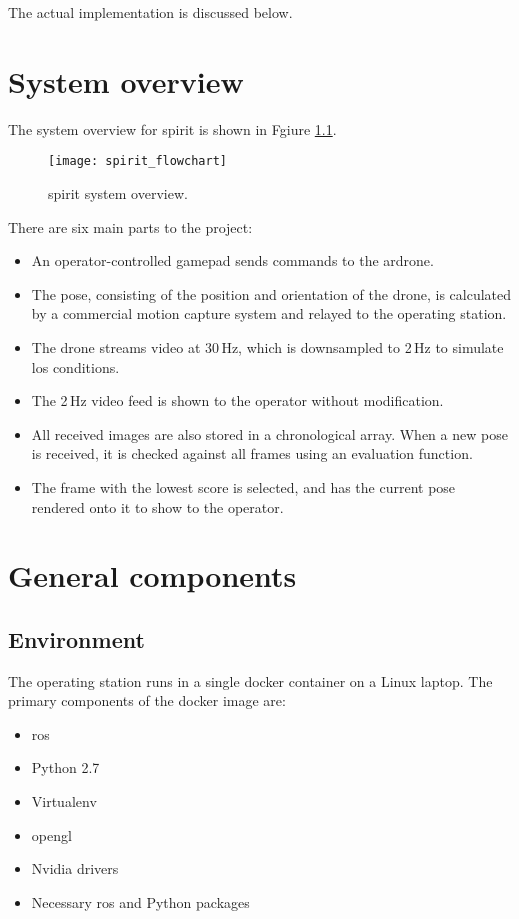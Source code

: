   The actual implementation is discussed below.

\chapter{System overview}
  The system overview for \gls{spirit} is shown in Fgiure \ref{fig:spirit_flowchart}.

  \begin{figure}[h]
    \centering
    \texttt{[image: spirit\_flowchart]}
    \caption[SPIRIT system overview]{\gls{spirit} system overview.}
    \label{fig:spirit_flowchart}
  \end{figure}

  There are six main parts to the project:

  \begin{itemize}
    \item An operator-controlled gamepad sends commands to the \gls{ardrone}.
    \item The pose, consisting of the position and orientation of the drone, is calculated by a commercial motion capture system and relayed to the operating station.
    \item The drone streams video at 30\,Hz, which is downsampled to 2\,Hz to simulate \gls{los} conditions.
    \item The 2\,Hz video feed is shown to the operator without modification.
    \item All received images are also stored in a chronological array.
	  When a new pose is received, it is checked against all frames using an evaluation function.
    \item The frame with the lowest score is selected, and has the current pose rendered onto it to show to the operator.
  \end{itemize}

\chapter{General components}
  \section{Environment}
    The operating station runs in a single \gls{docker} container on a Linux laptop.
    The primary components of the \gls{docker} image are:

    \begin{itemize}
      \item \gls{ros}
      \item Python 2.7
      \item Virtualenv
      \item \gls{opengl}
      \item Nvidia drivers
      \item Necessary \gls{ros} and Python packages
    \end{itemize}

